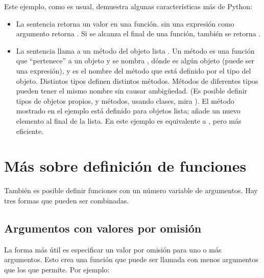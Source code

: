 \documentclass[a4,10pt,spanish]{sphinxmanual}
\begin{document}
\sphinxAtStartPar
Este ejemplo, como es usual, demuestra algunas características más de Python:
\begin{itemize}
\item {} 
\sphinxAtStartPar
La sentencia  retorna un valor en una función.  sin una expresión como argumento retorna . Si se alcanza el final de una función, también se retorna .

\item {} 
\sphinxAtStartPar
La sentencia  llama a un método del objeto lista . Un método es una función que “pertenece” a un objeto y se nombra , dónde  es algún objeto (puede ser una expresión), y  es el nombre del método que está definido por el tipo del objeto. Distintos tipos definen distintos métodos. Métodos de diferentes tipos pueden tener el mismo nombre sin causar ambigüedad. (Es posible definir tipos de objetos propios, y métodos, usando clases, mira {\hyperref[\detokenize{tutorial/classes:tut-classes}]{}}). El método  mostrado en el ejemplo está definido para objetos lista; añade un nuevo elemento al final de la lista. En este ejemplo es equivalente a , pero más eficiente.

\end{itemize}


\section{Más sobre definición de funciones}
\label{\detokenize{tutorial/controlflow:more-on-defining-functions}}\label{\detokenize{tutorial/controlflow:tut-defining}}
\sphinxAtStartPar
También es posible definir funciones con un número variable de argumentos. Hay tres formas que pueden ser combinadas.


\subsection{Argumentos con valores por omisión}
\label{\detokenize{tutorial/controlflow:default-argument-values}}\label{\detokenize{tutorial/controlflow:tut-defaultargs}}
\sphinxAtStartPar
La forma más útil es especificar un valor por omisión para uno o más argumentos. Esto crea una función que puede ser llamada con menos argumentos que los que permite. Por ejemplo:
\end{document}
